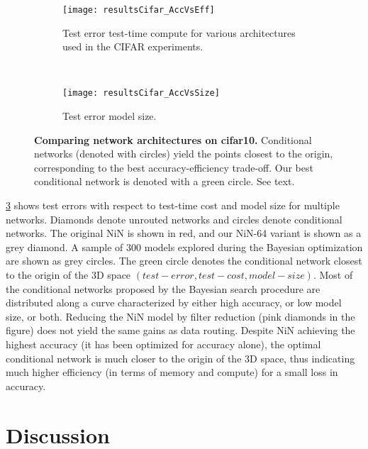 \documentclass[thesis]{subfiles}
\begin{document}
	
	\begin{figure}[tbp] 
		\centering
		\begin{subfigure}[b]{0.95\linewidth}
			\centering
			\texttt{[image: resultsCifar\_AccVsEff]}
			\caption{Test error \vs test-time compute for various architectures used in the CIFAR experiments.}\label{fig:resultsCifar_AccVsEff}
		\end{subfigure}
		~
		\begin{subfigure}[b]{0.95\linewidth}
			\centering
			\texttt{[image: resultsCifar\_AccVsSize]}
			\caption{Test error \vs model size.}\label{fig:resultsCifar_AccVsSize}
		\end{subfigure}
		\caption[Comparing network architectures on \gls{cifar10}]{\textbf{Comparing network architectures on \gls{cifar10}.} Conditional networks (denoted with circles) yield the points closest to the origin, corresponding to the best accuracy-efficiency trade-off. Our best conditional network is denoted with a green circle. See text.}\label{fig:Cifar_results}
	\end{figure}
	\cref{fig:Cifar_results} shows test errors with respect to test-time cost and model size for multiple networks.
	Diamonds denote unrouted networks and circles denote conditional networks. 
	The original NiN is shown in red, and our NiN-64 variant is shown as a grey diamond.
	A sample of 300 models explored during the Bayesian optimization are shown as grey circles.
	The green circle denotes the conditional network closest to the origin of the 
	3D space $(test-error,test-cost,model-size)$.
	Most of the conditional networks proposed by the Bayesian search procedure are distributed along a curve characterized by either high accuracy, or low model size, or both. 
	Reducing the NiN model by filter reduction (pink diamonds in the figure) does not yield the same gains as data routing.
	Despite NiN achieving the highest accuracy (it has been optimized for accuracy alone), the optimal conditional network is much closer to the origin of the 3D space, thus indicating much higher efficiency (in terms of memory and compute) for a small loss in accuracy.
	
	\section{Discussion}

\end{document}
